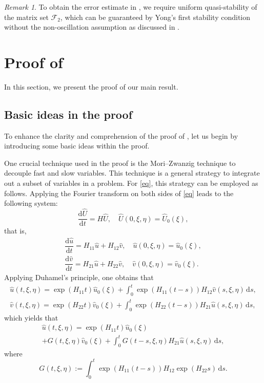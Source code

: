 \documentclass{article}
\theoremstyle{plain}%
\theoremstyle{definition}%
\theoremstyle{remark}%
\newtheorem{remark}{Remark}%
\newcommand{\cF}{\mathcal{F}}
\newcommand{\rd}{\mathrm{d}}
\newcommand{\+}[1]{{\bm{#1}}}
\newcommand{\od}[2]{\dfrac{\rd{#1}}{\rd{#2}}}
\begin{document}
\begin{remark}
  To obtain the error estimate in , we require uniform 
  quasi-stability of the matrix set $\cF_2$, which can be guaranteed 
  by Yong's first stability condition without the non-oscillation 
  assumption as discussed in .
\end{remark}

\section{Proof of }
\label{sec:proof}

In this section, we present the proof of our main result.


\subsection{Basic ideas in the proof}
To enhance the clarity and comprehension of the proof of , 
let us begin by introducing some basic ideas within the proof. 

One crucial technique used in the proof is the Mori--Zwanzig technique
\cite{E2011Principles,mori1965transport,zwanzig1960collision} 
to decouple fast and slow variables. 
This technique is a general strategy to 
integrate out a subset of variables in a problem.
For \cref{eq}, this strategy can be employed as follows.
Applying the Fourier transform on both sides of \eqref{eq} leads to 
the following system:
\begin{displaymath}
  \od{\hat{U}}{t} = H \hat{U}, \quad 
  \hat{U}(0, \xi, \eta) = \hat{U}_0(\xi),
\end{displaymath}
that is, 
\begin{gather*}
  \od{\hat{u}}{t} = H_{11} \hat{u} + H_{12} \hat{v}, \quad 
  \hat{u}(0, \xi, \eta) = \hat{u}_0(\xi), \\
  \od{\hat{v}}{t} = H_{21} \hat{u} + H_{22} \hat{v}, \quad
  \hat{v}(0, \xi, \eta) = \hat{v}_0(\xi).
\end{gather*}
Applying Duhamel's principle, one obtains that 
\begin{gather}
  \label{eq:duhamel_u}
  \hat{u}(t, \xi, \eta) = \exp(H_{11} t) \hat{u}_0(\xi) + \int_0^t 
  \exp(H_{11} (t - s)) H_{12} \hat{v}(s, \xi, \eta) \,\rd s, \\
  \label{eq:duhamel_v}
  \hat{v}(t, \xi, \eta) = \exp(H_{22} t) \hat{v}_0(\xi) + \int_0^t 
  \exp(H_{22} (t - s)) H_{21} \hat{u}(s, \xi, \eta) \,\rd s, 
\end{gather}
which yields that 
\begin{multline}\label{eq:MZ}
  \hat{u}(t, \xi, \eta) = \exp(H_{11} t) \hat{u}_0(\xi) \\ + 
  G(t, \xi, \eta) \hat{v}_0(\xi) + 
  \int_{0}^{t} G(t - s, \xi, \eta) H_{21} \hat{u}(s, \xi, \eta) 
  \,\rd s,
\end{multline}
where 
\begin{equation}\label{eq:key_term}
  G(t, \xi, \eta) := \int_{0}^{t} \exp ( H_{11} (t - s) )
  H_{12} \exp(H_{22} s) \,\rd s.
\end{equation}
\end{document}
